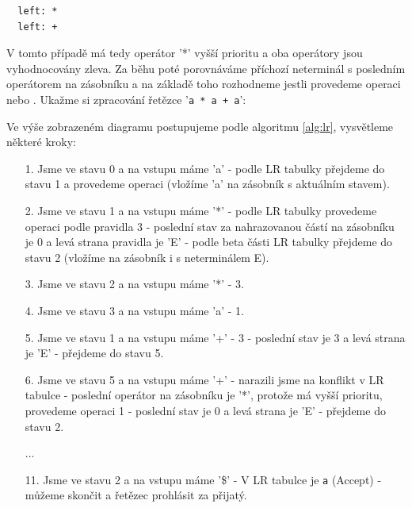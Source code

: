 \begin{exmp}
\begin{lstlisting}
  left: *
  left: +
\end{lstlisting}

V tomto případě má tedy operátor '*' vyšší prioritu a oba operátory jsou vyhodnocovány zleva.
Za běhu poté porovnáváme příchozí neterminál s posledním operátorem na zásobníku
a na základě toho rozhodneme jestli provedeme operaci  nebo .
Ukažme si zpracování řetězce '\texttt{a * a + a}':

\begin{figure}[H]
  \centering
\end{figure}

Ve výše zobrazeném diagramu postupujeme podle algoritmu \ref{alg:lr},
vysvětleme některé kroky:
\begin{itemize}
  \item[1.] Jsme ve stavu 0 a na vstupu máme 'a' - podle LR tabulky přejdeme do
  stavu 1 a provedeme operaci  (vložíme 'a' na zásobník s aktuálním stavem).
  \item[2.] Jsme ve stavu 1 a na vstupu máme '*' - podle LR tabulky provedeme
  operaci  podle pravidla 3 - poslední stav za nahrazovanou částí na
  zásobníku je 0 a levá strana pravidla je 'E' - podle beta části LR tabulky
  přejdeme do stavu 2 (vložíme na zásobník i s neterminálem E).
  \item[3.] Jsme ve stavu 2 a na vstupu máme '*' -  3.
  \item[4.] Jsme ve stavu 3 a na vstupu máme 'a' -  1.
  \item[5.] Jsme ve stavu 1 a na vstupu máme '+' -  3
   - poslední stav je 3 a levá strana je 'E' - přejdeme do stavu 5.
  \item[6.] Jsme ve stavu 5 a na vstupu máme '+' - narazili jsme na  konflikt
  v LR tabulce - poslední operátor na zásobníku je '*', protože má vyšší prioritu,
  provedeme operaci  1 - poslední stav je 0 a levá strana je 'E' - přejdeme do stavu 2.
  \item[] ...
  \item[11.] Jsme ve stavu 2 a na vstupu máme '\$' - V LR tabulce je \texttt{a}
  (Accept) - můžeme skončit a řetězec prohlásit za přijatý.
\end{itemize}
\end{exmp}

